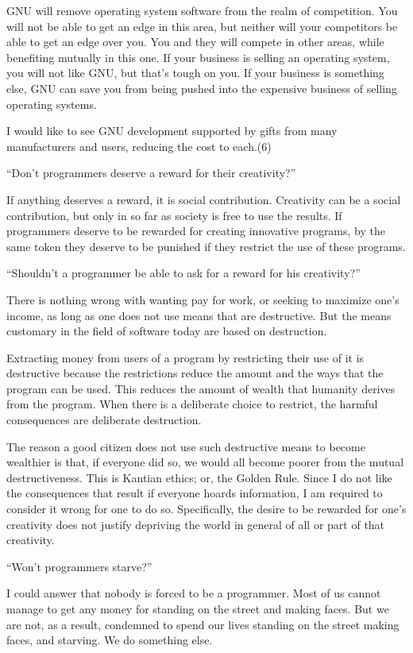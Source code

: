 GNU will remove operating system software from the realm of competition. You will not be able to get an edge in this area, but neither will your competitors be able to get an edge over you. You and they will compete in other areas, while benefiting mutually in this one. If your business is selling an operating system, you will not like GNU, but that's tough on you. If your business is something else, GNU can save you from being pushed into the expensive business of selling operating systems.

I would like to see GNU development supported by gifts from many manufacturers and users, reducing the cost to each.(6)

“Don't programmers deserve a reward for their creativity?”

If anything deserves a reward, it is social contribution. Creativity can be a social contribution, but only in so far as society is free to use the results. If programmers deserve to be rewarded for creating innovative programs, by the same token they deserve to be punished if they restrict the use of these programs.

“Shouldn't a programmer be able to ask for a reward for his creativity?”

There is nothing wrong with wanting pay for work, or seeking to maximize one's income, as long as one does not use means that are destructive. But the means customary in the field of software today are based on destruction.

Extracting money from users of a program by restricting their use of it is destructive because the restrictions reduce the amount and the ways that the program can be used. This reduces the amount of wealth that humanity derives from the program. When there is a deliberate choice to restrict, the harmful consequences are deliberate destruction.

The reason a good citizen does not use such destructive means to become wealthier is that, if everyone did so, we would all become poorer from the mutual destructiveness. This is Kantian ethics; or, the Golden Rule. Since I do not like the consequences that result if everyone hoards information, I am required to consider it wrong for one to do so. Specifically, the desire to be rewarded for one's creativity does not justify depriving the world in general of all or part of that creativity.

“Won't programmers starve?”

I could answer that nobody is forced to be a programmer. Most of us cannot manage to get any money for standing on the street and making faces. But we are not, as a result, condemned to spend our lives standing on the street making faces, and starving. We do something else.

